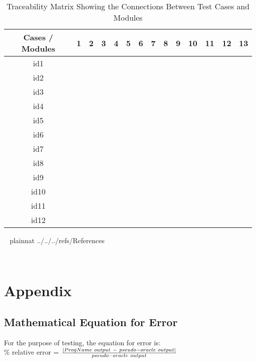 \documentclass[12pt, titlepage]{article}
\begin{document}
\begin{table}[!h]
	\begin{center}
		\begin{tabular}{| c | c | c | c | c | c | c | c | c | c | c | c | c | c |}
			\hline
			Cases / Modules & 1 & 2 & 3 & 4 & 5 & 6 & 7 & 8 & 9 & 10 & 11 & 12 & 13\\
			\hline
			id1 & &\checkmark & & & & & & & & & & &\\
			\hline
			id2 && \checkmark& & & & & & & & & & &\\
			\hline
			id3 & && \checkmark&  & & & & & & & & &\\
			\hline
			id4 & & &&\checkmark &  & & & & & & & &\\
			\hline
			id5 & && &\checkmark &  & & & & & & & &\\
			\hline
			id6 & && &\checkmark & & & & & & & & &\\
			\hline
			id7 & & &&\checkmark &  & & & & & & & &\\
			\hline
			id8 & & & & & & & & \checkmark& & & & &\\
			\hline
			id9 & & & & & & & & & \checkmark& & & &\\
			\hline
			id10 & & & & & & & & & & \checkmark& & &\\
			\hline
			id11 & &\checkmark & & & & & & & & & & &\\
			\hline
			id12 & & & & & & & & &\checkmark & & & &\\
			\hline
		\end{tabular}
		\caption{Traceability Matrix Showing the Connections Between Test Cases and Modules}
		\label{Table:MODCOVT}
	\end{center}
\end{table}  

~\newpage
\clearpage
 {plainnat}
 {../../../refs/References}

~\newpage
\section{Appendix}
\subsection{Mathematical Equation for Error}
\label{eqerror}

For the purpose of testing, the equation for error is:\\

\% relative error = $\frac{ |{\progname}\ output\ -\ pseudo-oracle\ output| }{pseudo-oracle\ output}$
\end{document}
